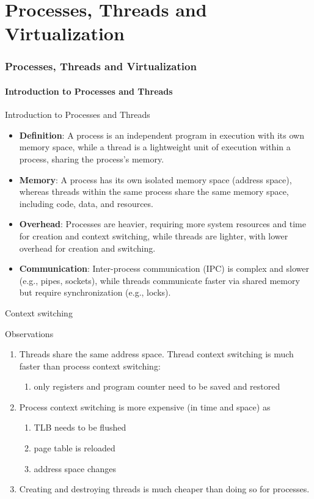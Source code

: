 \part{Processes, Threads and Virtualization}
\section{Processes, Threads and Virtualization}
\subsection{Introduction to Processes and Threads}
\begin{frame}{Introduction to Processes and Threads}
  \begin{itemize}
    \item \textbf{Definition}: A process is an independent program in execution with its own memory space, while a thread is a lightweight unit of execution within a process, sharing the process's memory.
    \item \textbf{Memory}: A process has its own isolated memory space (address space), whereas threads within the same process share the same memory space, including code, data, and resources.
    \item \textbf{Overhead}: Processes are heavier, requiring more system resources and time for creation and context switching, while threads are lighter, with lower overhead for creation and switching.
    \item \textbf{Communication}: Inter-process communication (IPC) is complex and slower (e.g., pipes, sockets), while threads communicate faster via shared memory but require synchronization (e.g., locks).
  \end{itemize}
\end{frame}
\begin{frame}{Context switching}
  \begin{block}{Observations}
    \begin{enumerate}
      \item Threads share the same address space. Thread context switching
            is much faster than process context switching:
            \begin{enumerate}
              \item only registers and program counter need to be saved and restored
            \end{enumerate}
      \item Process context switching is more expensive (in time and space) as
            \begin{enumerate}
              \item TLB needs to be flushed
              \item page table is reloaded
              \item address space changes
            \end{enumerate}
      \item Creating and destroying threads is much cheaper than doing so for processes.
    \end{enumerate}
  \end{block}
\end{frame}
